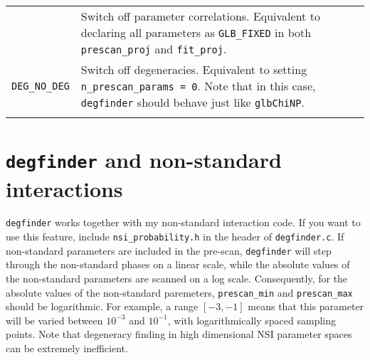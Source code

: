 \documentclass{article}
\begin{document}
\begin{longtable}{p{3cm}p{9cm}}
\begin{tabular}{lp{6.3cm}}
                               {\tt DEG\_NO\_CORR} & Switch off parameter correlations. Equivalent to
                                                     declaring all parameters as {\tt GLB\_FIXED} in both
                                                     {\tt prescan\_proj} and {\tt fit\_proj}. \\
                               {\tt DEG\_NO\_DEG}  & Switch off degeneracies. Equivalent to
                                                     setting {\tt n\_prescan\_params = 0}. Note that in
                                                     this case, {\tt degfinder} should behave just like
                                                     {\tt glbChiNP}. \\
                             \end{tabular} \\
  \bottomrule
\end{longtable}


\section{{\tt degfinder} and non-standard interactions}

{\tt degfinder} works together with my non-standard interaction code. If you want to
use this feature, include {\tt nsi\_probability.h} in the header of {\tt degfinder.c}. If non-standard
parameters are included in the pre-scan, {\tt degfinder} will step through the non-standard phases
on a linear scale, while the absolute values of the non-standard parameters are scanned
on a log scale. Consequently, for the absolute values of the non-standard paremeters,
{\tt prescan\_min} and {\tt prescan\_max} should be logarithmic. For example, a range
$[-3, -1]$ means that this parameter will be varied between $10^{-3}$ and $10^{-1}$,
with logarithmically spaced sampling points. Note that degeneracy finding in high
dimensional NSI parameter spaces can be extremely inefficient.
\end{document}
